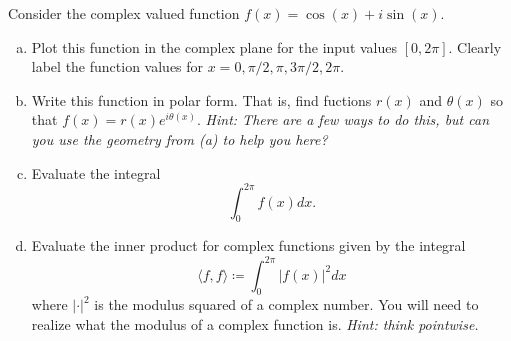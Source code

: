 \documentclass[12pt]{article} %
\newcommand{\innprod}[2]{\langle #1, #2\rangle}
\begin{document}
\begin{problem}
	Consider the complex valued function $f(x) = \cos(x)+i\sin(x)$.  
	\begin{enumerate}[(a)]
		\item Plot this function in the complex plane for the input values $[0,2\pi]$. Clearly label the function values for $x=0,\pi/2,\pi,3\pi/2,2\pi$.
		\item Write this function in polar form. That is, find fuctions $r(x)$ and $\theta(x)$ so that $f(x)=r(x)e^{i\theta(x)}$. \emph{Hint: There are a few ways to do this, but can you use the geometry from (a) to help you here?}
		\item Evaluate the integral
		\[
			\int_0^{2\pi}f(x)dx.
		\]
		\item Evaluate the inner product for complex functions given by the integral
		\[
			\innprod{f}{f}\coloneqq \int_0^{2\pi} |f(x)|^2dx
		\]
		where $|\cdot|^2$ is the modulus squared of a complex number. You will need to realize what the modulus of a complex function is. \emph{Hint: think pointwise.}
	\end{enumerate}
\end{problem}
\end{document}

